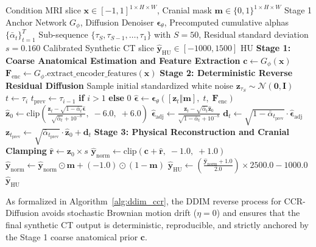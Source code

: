 \begin{algorithm}[htbp]
\caption{50-Step Deterministic DDIM Reverse Sampling for CCR-Diffusion}
\label{alg:ddim_ccr}
\begin{algorithmic}[1]
\REQUIRE Condition MRI slice $\mathbf{x} \in [-1, 1]^{1 \times H \times W}$, Cranial mask $\mathbf{m} \in \{0, 1\}^{1 \times H \times W}$
\REQUIRE Stage 1 Anchor Network $G_\phi$, Diffusion Denoiser $\boldsymbol{\epsilon}_\theta$, Precomputed cumulative alphas $\{\bar{\alpha}_t\}_{t=1}^T$
\REQUIRE Sub-sequence $\{\tau_S, \tau_{S-1}, \dots, \tau_1\}$ with $S = 50$, Residual standard deviation $s = 0.160$
\ENSURE Calibrated Synthetic CT slice $\mathbf{\hat{y}}_{\text{HU}} \in [-1000, 1500]\text{ HU}$
\STATE \textbf{Stage 1: Coarse Anatomical Estimation and Feature Extraction}
\STATE $\mathbf{c} \leftarrow G_\phi(\mathbf{x})$ 
\STATE $\mathbf{F}_{\text{enc}} \leftarrow G_\phi.\text{extract\_encoder\_features}(\mathbf{x})$ 
\STATE \textbf{Stage 2: Deterministic Reverse Residual Diffusion}
\STATE Sample initial standardized white noise $\mathbf{z}_{\tau_S} \sim \mathcal{N}(\mathbf{0}, \mathbf{I})$
    \STATE $t \leftarrow \tau_i$
    \STATE $t_{\text{prev}} \leftarrow \tau_{i-1}$ \textbf{if} $i > 1$ \textbf{else} $0$
    \STATE $\hat{\boldsymbol{\epsilon}} \leftarrow \boldsymbol{\epsilon}_\theta\left( [\mathbf{z}_t \mathbin{\Vert} \mathbf{m}], \; t, \; \mathbf{F}_{\text{enc}} \right)$ 
    \STATE $\hat{\mathbf{z}}_0 \leftarrow \text{clip}\left( \frac{\mathbf{z}_t - \sqrt{1 - \bar{\alpha}_t}\hat{\boldsymbol{\epsilon}}}{\sqrt{\bar{\alpha}_t} + 10^{-8}}, \; -6.0, \; +6.0 \right)$ 
    \STATE $\hat{\boldsymbol{\epsilon}}_{\text{adj}} \leftarrow \frac{\mathbf{z}_t - \sqrt{\bar{\alpha}_t} \hat{\mathbf{z}}_0}{\sqrt{1 - \bar{\alpha}_t} + 10^{-8}}$ 
    \STATE $\mathbf{d}_t \leftarrow \sqrt{1 - \bar{\alpha}_{t_{\text{prev}}}} \cdot \hat{\boldsymbol{\epsilon}}_{\text{adj}}$ 
    \STATE $\mathbf{z}_{t_{\text{prev}}} \leftarrow \sqrt{\bar{\alpha}_{t_{\text{prev}}}} \cdot \hat{\mathbf{z}}_0 + \mathbf{d}_t$ 
\ENDFOR
\STATE \textbf{Stage 3: Physical Reconstruction and Cranial Clamping}
\STATE $\mathbf{\hat{r}} \leftarrow \mathbf{z}_0 \times s$ 
\STATE $\mathbf{\hat{y}}_{\text{norm}} \leftarrow \text{clip}\left( \mathbf{c} + \mathbf{\hat{r}}, \; -1.0, \; +1.0 \right)$ 
\STATE $\mathbf{\hat{y}}_{\text{norm}} \leftarrow \mathbf{\hat{y}}_{\text{norm}} \odot \mathbf{m} + (-1.0) \odot (1 - \mathbf{m})$ 
\STATE $\mathbf{\hat{y}}_{\text{HU}} \leftarrow \left( \frac{\mathbf{\hat{y}}_{\text{norm}} + 1.0}{2.0} \right) \times 2500.0 - 1000.0$ 
\RETURN $\mathbf{\hat{y}}_{\text{HU}}$
\end{algorithmic}
\end{algorithm}

As formalized in Algorithm~\ref{alg:ddim_ccr}, the DDIM reverse process for CCR-Diffusion avoids stochastic Brownian motion drift ($\eta = 0$) and ensures that the final synthetic CT output is deterministic, reproducible, and strictly anchored by the Stage 1 coarse anatomical prior $\mathbf{c}$.
